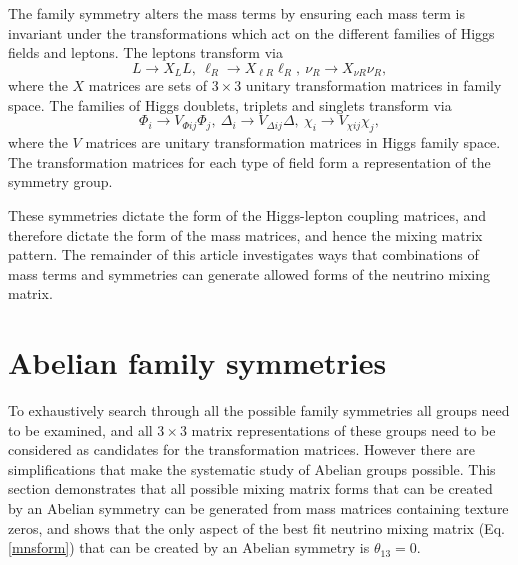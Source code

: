 \documentclass[nofootinbib,showpacs]{revtex4}
\begin{document}
The family symmetry alters the mass terms by ensuring each mass term is invariant under the transformations which act on the different families of Higgs fields and leptons. 
The leptons transform via
\begin{equation}
L \rightarrow X_L L, \: \ell_R\rightarrow X_{\ell R} \ell_R,\: \nu_R\rightarrow X_{\nu R} \nu_R,
\end{equation} 
where the $X$ matrices are sets of $3\times 3$ unitary transformation matrices in family space. 
The families of Higgs doublets, triplets and singlets transform via 
\begin{equation}
\Phi_i \rightarrow V_{\Phi ij} \Phi_j,\:
\Delta_i \rightarrow V_{\Delta ij} \Delta,\:
\chi_i \rightarrow V_{\chi ij} \chi_j,
\end{equation}
where the $V$ matrices are unitary transformation matrices in Higgs family space.
The transformation matrices for each type of field form a representation of the symmetry group. 

These symmetries dictate the form of the Higgs-lepton coupling matrices, and therefore dictate the form of the mass matrices, and hence the mixing matrix pattern. The remainder of this article investigates ways that combinations of mass terms and symmetries can generate allowed forms of the neutrino mixing matrix.

\section{Abelian family symmetries}\label{abelian}

To exhaustively search through all the possible family symmetries all groups need to be examined, and all $3\times 3$ matrix representations of these groups need to be considered as candidates for the transformation matrices. However there are simplifications that make the systematic study of Abelian groups possible. This section demonstrates that all possible mixing matrix forms that can be created by an Abelian symmetry can be generated from mass matrices containing texture zeros, and shows that the only aspect of the best fit neutrino mixing matrix (Eq. \ref{mnsform}) that can be created by an Abelian symmetry is $\theta_{13}=0$.
\end{document}
